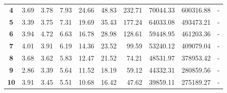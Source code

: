 \begin{table}[h]
\begin{center}
\begin{tabular}{crrrrrrrrr}
\textbf{4}                         & 3.69                           & 3.78                           & 7.93                        & 24.66                          & 48.83                           & 232.71                          & 70044.33                        & 600316.88                        & -                                \\
\textbf{5}                         & 3.39                           & 3.75                         & 7.31                       & 19.69                          & 35.43                           & 177.24                          & 64033.08                        & 493473.21                        & -                                \\
\textbf{6}                         & 3.94                           & 4.72                          & 6.63                         & 16.78                          & 28.98                           & 128.61                          & 59448.95                        & 461203.36                        & -                                \\
\textbf{7}                         & 4.01                           & 3.91                          & 6.19                        & 14.36                          & 23.52                           & 99.59                           & 53240.12                        & 409079.04                        & -                                \\
\textbf{8}                         & 3.68                           & 3.62                           & 5.83                        & 12.47                          & 21.52                           & 74.21                           & 48531.97                        & 378953.42                        & -                                \\
\textbf{9}                         & 2.86                           & 3.39                          & 5.64                        & 11.52                          & 18.19                           & 59.12                           & 44332.31                        & 280859.56                        & -                                \\
\textbf{10}                        & 3.91                           & 3.45                           & 5.51                           & 10.68                          & 16.42                           & 47.62                           & 39859.11                       & 275189.27                        & -                                \\

\end{tabular}
\end{center}
\end{table}
